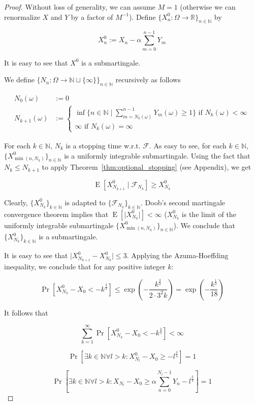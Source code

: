 \documentclass[11pt]{article}
\theoremstyle{definition}
\theoremstyle{plain}
\newcommand{\Nats}{\mathbb{N}}
\newcommand{\Reals}{\mathbb{R}}
\newcommand{\A}[1]{\lvert #1 \rvert}
\newcommand{\Sq}[2]{\{#1\}_{#2 \in \Nats}}
\newcommand{\Sqn}[1]{\Sq{#1}{n}}
\DeclareMathOperator{\E}{E}
\newcommand{\F}{\mathcal{F}}
\begin{document}
\begin{proof}

Without loss of generality, we can assume ${M = 1}$ (otherwise we can renormalize ${X}$ and ${Y}$ by a factor of ${M^{-1}}$). Define ${\Sqn{X^0_n: \Omega \rightarrow \Reals}}$ by

$$X^0_n := X_n - \alpha \sum_{m=0}^{n-1} Y_m$$

It is easy to see that ${X^0}$ is a submartingale.

We define ${\Sqn{N_n:\Omega \rightarrow \Nats \sqcup \{\infty\}}}$ recursively as follows

\begin{align*}
N_0(\omega) &:= 0 \\ 
N_{k+1}(\omega) &:= \begin{cases}\inf \{n \in \Nats \mid \sum_{m=N_k(\omega)}^{n-1} Y_m(\omega) \geq 1\} \text{ if } N_k(\omega) < \infty\\\infty \text{ if } N_k(\omega) = \infty\end{cases}
\end{align*}

For each $k \in \Nats$, $N_k$ is a stopping time w.r.t. ${\F}$. As easy to see, for each $k \in \Nats$, ${\Sqn{X^0_{\min(n,N_k)}}}$ is a uniformly integrable submartingale. Using the fact that ${N_{k} \leq N_{k+1}}$ to apply Theorem~\ref{thm:optional_stopping} (see Appendix), we get

$$\E[X^0_{N_{k+1}} \mid \F_{N_k}] \geq X^0_{N_{k}}$$

Clearly, ${\Sq{X^0_{N_k}}{k}}$ is adapted to ${\Sq{\F_{N_k}}{k}}$. Doob's second martingale convergence theorem implies that ${\E[\A{X^0_{N_k}}] < \infty}$ (${X^0_{N_k}}$ is the limit of the uniformly integrable submartingale ${\Sqn{X^0_{\min(n,N_k)}}}$). We conclude that ${\Sq{X^0_{N_k}}{k}}$ is a submartingale.

It is easy to see that ${\A{X^0_{N_{k+1}}-X^0_{N_k}}} \leq 3$. Applying the Azuma-Hoeffding inequality, we conclude that for any positive integer ${k}$:

$$\Pr[X^0_{N_k} - X_0 < -k^{\frac{3}{4}}] \leq \exp(-\frac{k^{\frac{3}{2}}}{2 \cdot 3^2k})=\exp(-\frac{k^{\frac{1}{2}}}{18})$$

It follows that

$$\sum_{k=1}^\infty \Pr[X^0_{N_k} - X_0 < -k^{\frac{3}{4}}] < \infty$$

$$\Pr[\exists k \in \Nats \forall l > k: X^0_{N_l} - X_0 \geq -l^{\frac{3}{4}}] = 1$$

$$\Pr[\exists k \in \Nats \forall l > k: X_{N_l} - X_0 \geq \alpha \sum_{n=0}^{N_l - 1} Y_n - l^{\frac{3}{4}}] = 1$$


\end{proof}
\end{document}
